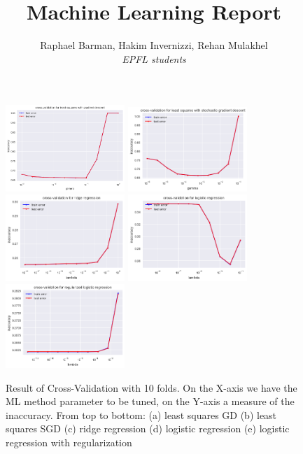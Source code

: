 \documentclass[10pt,conference,compsocconf]{IEEEtran}
\begin{document}
\title{Machine Learning Report}

\author{
  Raphael Barman, Hakim Invernizzi, Rehan Mulakhel\\
  \textit{EPFL students}
}

\maketitle

\begin{figure}
\begin{center}
\includegraphics[width=4.5cm]{cross_validation_least_squares_GD.png}
\includegraphics[width=4.5cm]{cross_validation_least_squares_SGD.png}
\includegraphics[width=4.5cm]{cross_validation_ridge_regression.png}
\includegraphics[width=4.5cm]{cross_validation_logistic_regression.png}
\includegraphics[width=4.5cm]{cross_validation_reg_logistic_regression.png}
 \end{center}
 \begin{center}
 \caption{\label{fig:figure1}Result of Cross-Validation with 10 folds. On the X-axis we have the ML method parameter to be tuned, on the Y-axis a measure of the inaccuracy. From top to bottom: (a) least squares GD (b) least squares SGD (c) ridge regression (d) logistic regression (e) logistic regression with regularization}
 \end{center}
\end{figure}
\end{document}
